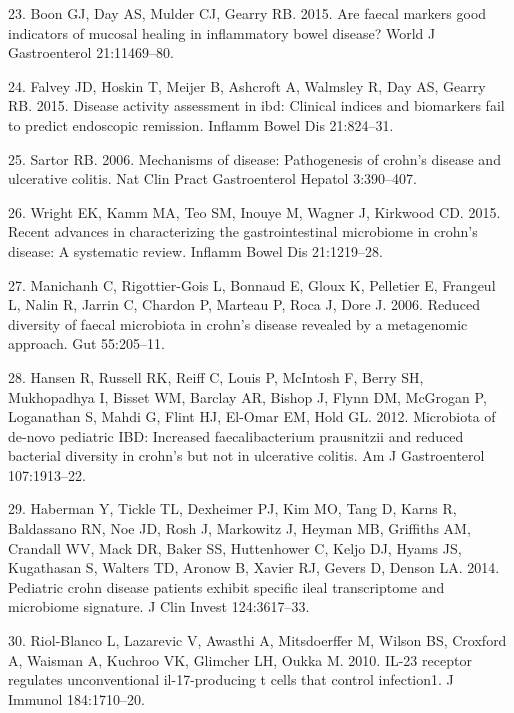 \documentclass[11pt,]{article}
\begin{document}
\hypertarget{ref-Boon_biomarkers_2015}{}
23. Boon GJ, Day AS, Mulder CJ, Gearry RB. 2015. Are faecal markers good
indicators of mucosal healing in inflammatory bowel disease? World J
Gastroenterol 21:11469--80.

\hypertarget{ref-Falvey_biomarkers_2015}{}
24. Falvey JD, Hoskin T, Meijer B, Ashcroft A, Walmsley R, Day AS,
Gearry RB. 2015. Disease activity assessment in ibd: Clinical indices
and biomarkers fail to predict endoscopic remission. Inflamm Bowel Dis
21:824--31.

\hypertarget{ref-sartor_IBDpath_2006}{}
25. Sartor RB. 2006. Mechanisms of disease: Pathogenesis of crohn's
disease and ulcerative colitis. Nat Clin Pract Gastroenterol Hepatol
3:390--407.

\hypertarget{ref-wright_CDmicrobiome_2015}{}
26. Wright EK, Kamm MA, Teo SM, Inouye M, Wagner J, Kirkwood CD. 2015.
Recent advances in characterizing the gastrointestinal microbiome in
crohn's disease: A systematic review. Inflamm Bowel Dis 21:1219--28.

\hypertarget{ref-manichanh_diversityCD_2006}{}
27. Manichanh C, Rigottier-Gois L, Bonnaud E, Gloux K, Pelletier E,
Frangeul L, Nalin R, Jarrin C, Chardon P, Marteau P, Roca J, Dore J.
2006. Reduced diversity of faecal microbiota in crohn's disease revealed
by a metagenomic approach. Gut 55:205--11.

\hypertarget{ref-hansen_pedsIBD_2012}{}
28. Hansen R, Russell RK, Reiff C, Louis P, McIntosh F, Berry SH,
Mukhopadhya I, Bisset WM, Barclay AR, Bishop J, Flynn DM, McGrogan P,
Loganathan S, Mahdi G, Flint HJ, El-Omar EM, Hold GL. 2012. Microbiota
of de-novo pediatric IBD: Increased faecalibacterium prausnitzii and
reduced bacterial diversity in crohn's but not in ulcerative colitis. Am
J Gastroenterol 107:1913--22.

\hypertarget{ref-haberman_pedsCD_2014}{}
29. Haberman Y, Tickle TL, Dexheimer PJ, Kim MO, Tang D, Karns R,
Baldassano RN, Noe JD, Rosh J, Markowitz J, Heyman MB, Griffiths AM,
Crandall WV, Mack DR, Baker SS, Huttenhower C, Keljo DJ, Hyams JS,
Kugathasan S, Walters TD, Aronow B, Xavier RJ, Gevers D, Denson LA.
2014. Pediatric crohn disease patients exhibit specific ileal
transcriptome and microbiome signature. J Clin Invest 124:3617--33.

\hypertarget{ref-Riol-Blanco_IL23microbiome_2010}{}
30. Riol-Blanco L, Lazarevic V, Awasthi A, Mitsdoerffer M, Wilson BS,
Croxford A, Waisman A, Kuchroo VK, Glimcher LH, Oukka M. 2010. IL-23
receptor regulates unconventional il-17-producing t cells that control
infection1. J Immunol 184:1710--20.
\end{document}
